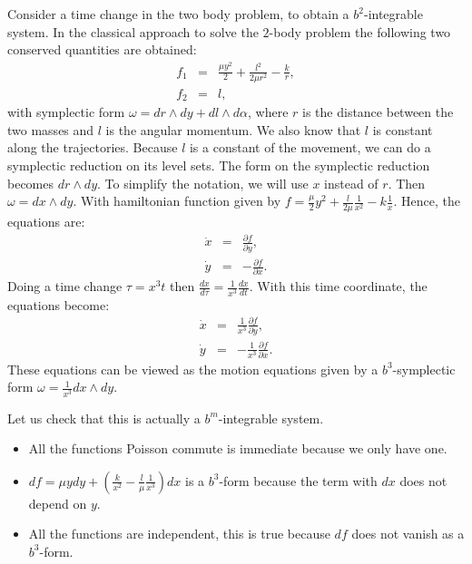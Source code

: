 \begin{example}
Consider a time change in the two body problem, to obtain a $b^2$-integrable system. In the classical approach to solve the $2$-body problem  the following two conserved quantities are obtained:
$$\begin{array}{rcl}
f_1 & = & \frac{\mu y^2}{2} + \frac{l^2}{2\mu r^2} - \frac{k}{r},\\
f_2 & = & l,
\end{array}
$$
with symplectic form $\omega = dr\wedge dy + dl \wedge d\alpha$, where $r$ is the distance between the two masses and $l$ is the angular momentum.
We also know that $l$ is constant along the trajectories. Because $l$ is a constant of the movement, we can do a symplectic reduction on its level sets. The form on the symplectic reduction becomes $dr \wedge dy$. To simplify the notation, we will use $x$ instead of $r$.
Then $\omega = dx\wedge dy$. With hamiltonian function given by $f = \frac{\mu}{2}y^2 + \frac{l}{2\mu}\frac{1}{x^2} - k \frac{1}{x}$. Hence, the equations are:
$$
\begin{array}{rcl}
 \dot{x} & = & \frac{\partial f}{\partial y},\\
 \dot{y} & = & -\frac{\partial f}{\partial x}.
\end{array}
$$
Doing a time change $\tau = x^3 t$ then $\frac{d x}{d\tau} = \frac{1}{x^3} \frac{dx}{dt}$. With this time coordinate, the equations become:
$$
\begin{array}{rcl}
 \dot{x} & = & \frac{1}{x^3}\frac{\partial f}{\partial y},\\
 \dot{y} & = & -\frac{1}{x^3}\frac{\partial f}{\partial x}.
\end{array}
$$
These equations can be viewed as the motion equations given by a $b^3$-symplectic form $\omega = \frac{1}{x^3} dx\wedge dy$.

Let us check that this is actually a $b^m$-integrable system.
\begin{itemize}%
\item All the functions Poisson commute is immediate because we only have one.
\item $df = \mu y dy + (\frac{k}{x^2} - \frac{l}{\mu}\frac{1}{x^3})dx$ is a $b^3$-form because the term with $dx$ does not depend on $y$.
\item All the functions are independent, this is true because $df$ does not vanish as a $b^3$-form.
\end{itemize}
\end{example}

